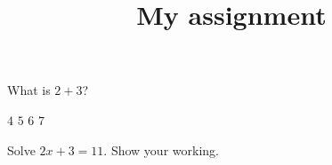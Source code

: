 \documentclass{exam}
\title{My assignment}
\begin{document}
\maketitle
\begin{questions}

\question What is $2 + 3$?
\begin{choices}
  \choice $4$
  \CorrectChoice $5$
  \choice $6$
  \choice $7$
\end{choices}

\question Solve $2x + 3 = 11$. Show your working.

\end{questions}
\end{document}
